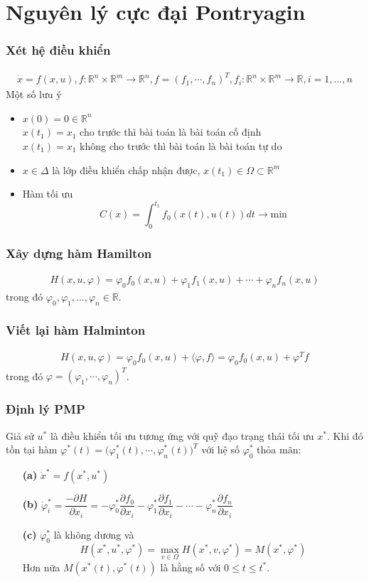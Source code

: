 \documentclass[12pt,a4paper]{report}
\begin{document}
\section{Nguyên lý cực đại Pontryagin}
\subsubsection{Xét hệ điều khiển} \begin{eqnarray}
	\dot{x}=f(x,u), f: \mathbb{R}^n \times \mathbb{R}^m \to \mathbb{R}^n, f = (f_1,\cdots,f_n)^T, f_i: \mathbb{R}^n \times \mathbb{R}^m \to \mathbb{R}, i=1,...,n \nonumber
\end{eqnarray}
Một số lưu ý
\begin{itemize}
	\item $x(0)=0 \in \mathbb{R}^n$\\$x(t_1) = x_1$ cho trước thì bài toán là bài toán cố định\\$x(t_1)=x_1$ không cho trước thì bài toán là bài toán tự do
	\item $x\in\Delta$ là lớp điều khiển chấp nhận được, $x(t_1)\in\Omega\subset\mathbb{R}^m$
	\item Hàm tối ưu $$C(x) = \int_{0}^{t_1}f_0(x(t), u(t))dt \to \text{min}$$
\end{itemize}
\subsubsection{Xây dựng hàm Hamilton}
\begin{eqnarray}
	H(x, u, \varphi) = \varphi_0f_0(x, u) + \varphi_1f_1(x, u) + \cdots + \varphi_nf_n(x,u)
\end{eqnarray} trong đó $\varphi_0, \varphi_1,...,\varphi_n \in \mathbb{R}$.
\subsubsection{Viết lại hàm Halminton}
\begin{eqnarray}
	H(x,u,\varphi
	)=\varphi_0f_0(x,u)+\langle\varphi,f\rangle = \varphi_0f_0(x,u) + \varphi^Tf
\end{eqnarray} trong đó $\varphi=(\varphi_1,\cdots,\varphi_n)^T$.

\subsubsection{Định lý PMP}
Giả sử $u^*$ là điều khiển tối ưu tương ứng với quỹ đạo trạng thái tối ưu $x^*$. Khi đó tồn tại hàm $\varphi^*(t) = \big(\varphi_1^*(t), \cdots,\varphi_n^*(t)\big)^T$ với hệ số $\varphi_0^*$ thỏa mãn: \begin{itemize}
	\item[\textbf{(a)}] $\dot{x}^* = f(x^*,u^*)$
	\item[\textbf{(b)}] $\dot{\varphi}_i^* = \dfrac{-\partial H}{\partial x_i} = -\varphi
	_0^*\dfrac{\partial f_0}{\partial x_i}-\varphi_1^*\dfrac{\partial f_1}{\partial x_i} - \cdots
	-\varphi
	^*_n\dfrac{\partial f_n}{\partial x_i}$
	\item[\textbf{(c)}] $\varphi_0^*$ là không dương và $$H(x^*,u^*,\varphi^*) = \max_{v\in\Omega} H(x^*,v,\varphi
	^*) = M(x^*,\varphi^*)$$ Hơn nữa $M(x^*(t), \varphi^*(t))$ là hằng số với $0\leq t\leq t^*$.
\end{itemize}
\end{document}
